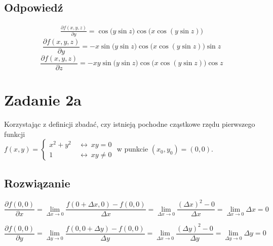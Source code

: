 \documentclass{article}
\newcommand{\for}{\ \leftrightarrow\ }
\DeclareMathOperator{\?}{?}
\begin{document}
\subsection*{Odpowiedź}
\begin{align*}
   \frac{\partial f(x,y,z)}{\partial y} = \cos{\big(y \sin{z}\big)} \cos\big(x \cos{(y \sin{z})}\big)
\end{align*}
\begin{equation*}
   \frac{\partial f(x,y,z)}{\partial y} = -x \sin{\big(y \sin z\big)} \cos{\big(x \cos{(y \sin z)} \big)} \sin{z}
\end{equation*}
\begin{equation*}
   \frac{\partial f(x,y,z)}{\partial z} = -xy \sin{\big(y \sin z \big)} \cos{\big(x \cos{(y \sin z)} \big)} \cos{z}
\end{equation*}

\vspace{3em}

\section*{Zadanie 2a}
Korzystając z definicji zbadać, czy istnieją pochodne cząstkowe rzędu pierwszego
funkcji \\ $\displaystyle f(x,y) = \left\{ \begin{array}{ll}
   x^2 + y^2 & \for xy = 0 \\
   1         & \for xy \ne 0
\end{array}\right. $ w punkcie $(x_0, y_0) = (0,0)$.

\subsection*{Rozwiązanie}

\begin{equation*}
   \frac{\partial f(0,0)}{\partial x} = \lim_{\Delta{x} \to 0} \frac{f(0+\Delta{x},0) - f(0,0)}{\Delta{x}} =
   \lim_{\Delta{x} \to 0} \frac{(\Delta{x})^2 - 0}{\Delta{x}} =
   \lim_{\Delta{x} \to 0} \Delta{x} = 0
\end{equation*}

\begin{equation*}
   \frac{\partial f(0,0)}{\partial y} = \lim_{\Delta{y} \to 0} \frac{f(0, 0+\Delta{y}) - f(0,0)}{\Delta{y}} =
   \lim_{\Delta{x} \to 0} \frac{(\Delta{y})^2 - 0}{\Delta{y}} =
   \lim_{\Delta{y} \to 0} \Delta{y} = 0
\end{equation*}

\vspace{3em}
\end{document}
